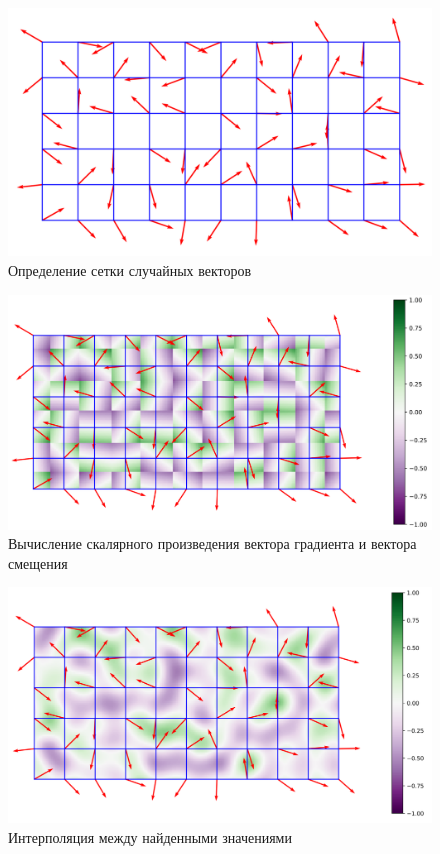 \documentclass[a4paper, 14pt]{extreport}
\begin{document}
\begin{figure}[h]
	\centering
	\includegraphics[scale=0.4]{tools/perling_1.png}
	\caption{Определение сетки случайных векторов}
	\label{analytic:p1}
\end{figure}

\begin{figure}[h]
	\centering
	\includegraphics[scale=0.4]{tools/perling_2.png}
	\caption{Вычисление скалярного произведения вектора градиента и вектора смещения}
	\label{analytic:p2}
\end{figure}

\begin{figure}[h]
	\centering
	\includegraphics[scale=0.4]{tools/perling_3.png}
	\caption{Интерполяция между найденными значениями}
	\label{analytic:p3}
\end{figure}
\end{document}
